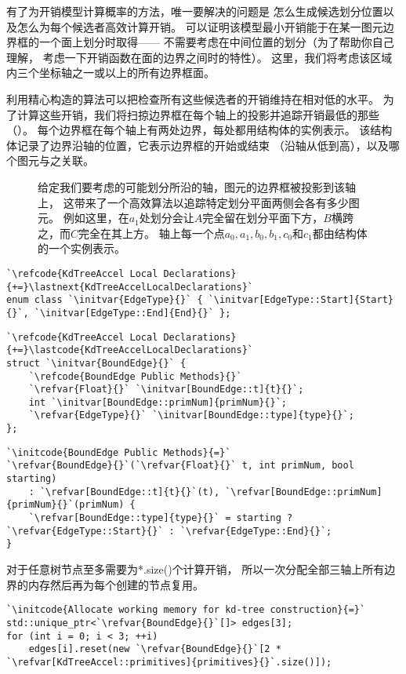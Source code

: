 有了为开销模型计算概率的方法，唯一要解决的问题是
怎么生成候选划分位置以及怎么为每个候选者高效计算开销。
可以证明该模型最小开销能于在某一图元边界框的一个面上划分时取得——
不需要考虑在中间位置的划分（为了帮助你自己理解，
考虑一下开销函数在面的边界之间时的特性）。
这里，我们将考虑该区域内三个坐标轴之一或以上的所有边界框面。

利用精心构造的算法可以把检查所有这些候选者的开销维持在相对低的水平。
为了计算这些开销，我们将扫掠边界框在每个轴上的投影并追踪开销最低的那些（）。
每个边界框在每个轴上有两处边界，每处都用结构体的实例表示。
该结构体记录了边界沿轴的位置，它表示边界框的开始或结束
（沿轴从低到高），以及哪个图元与之关联。
\begin{figure}[htbp]
    \centering
    \caption{给定我们要考虑的可能划分所沿的轴，图元的边界框被投影到该轴上，
    这带来了一个高效算法以追踪特定划分平面两侧会各有多少图元。
    例如这里，在$a_1$处划分会让$A$完全留在划分平面下方，$B$横跨之，而$C$完全在其上方。
    轴上每一个点$a_0,a_1,b_0,b_1,c_0$和$c_1$都由结构体的一个实例表示。}
    \label{fig:4.15}
\end{figure}
\begin{lstlisting}
`\refcode{KdTreeAccel Local Declarations}{+=}\lastnext{KdTreeAccelLocalDeclarations}`
enum class `\initvar{EdgeType}{}` { `\initvar[EdgeType::Start]{Start}{}`, `\initvar[EdgeType::End]{End}{}` };
\end{lstlisting}
\begin{lstlisting}
`\refcode{KdTreeAccel Local Declarations}{+=}\lastcode{KdTreeAccelLocalDeclarations}`
struct `\initvar{BoundEdge}{}` {
    `\refcode{BoundEdge Public Methods}{}`
    `\refvar{Float}{}` `\initvar[BoundEdge::t]{t}{}`;
    int `\initvar[BoundEdge::primNum]{primNum}{}`;
    `\refvar{EdgeType}{}` `\initvar[BoundEdge::type]{type}{}`;
};
\end{lstlisting}
\begin{lstlisting}
`\initcode{BoundEdge Public Methods}{=}`
`\refvar{BoundEdge}{}`(`\refvar{Float}{}` t, int primNum, bool starting)
    : `\refvar[BoundEdge::t]{t}{}`(t), `\refvar[BoundEdge::primNum]{primNum}{}`(primNum) {
    `\refvar[BoundEdge::type]{type}{}` = starting ? `\refvar{EdgeType::Start}{}` : `\refvar{EdgeType::End}{}`; 
}
\end{lstlisting}

对于任意树节点至多需要为{*.size()}个计算开销，
所以一次分配全部三轴上所有边界的内存然后再为每个创建的节点复用。
\begin{lstlisting}
`\initcode{Allocate working memory for kd-tree construction}{=}`
std::unique_ptr<`\refvar{BoundEdge}{}`[]> edges[3];
for (int i = 0; i < 3; ++i)
    edges[i].reset(new `\refvar{BoundEdge}{}`[2 * `\refvar[KdTreeAccel::primitives]{primitives}{}`.size()]);
\end{lstlisting}

